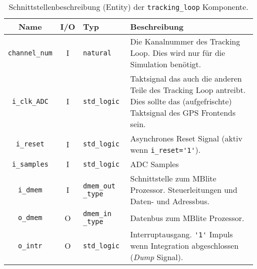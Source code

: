 \begin{table}[htbp]
    \ttabbox
    {
        \caption[Carrier NCO Schnittstelle]{Schnittstellenbeschreibung (Entity) der \lstinline$tracking_loop$ Komponente.}
        \label{Tab_tracking_loop_Entity}
    }
    {
    \begin{tabular}{c c  p{1.5cm} p{6cm}}
        \toprule
        Name                    & I/O	& Typ				& Beschreibung \\
        \midrule
        \lstinline$channel_num$	& I	& \lstinline$natural$		& Die Kanalnummer des Tracking Loop. Dies wird nur für die Simulation benötigt. \\
        \lstinline$i_clk_ADC$	& I	& \lstinline$std_logic$		& Taktsignal das auch die anderen Teile des Tracking Loop antreibt. Dies sollte das (aufgefrischte) Taktsignal des GPS Frontends sein.\\
        \lstinline$i_reset$	& I	& \lstinline$std_logic$		& Asynchrones Reset Signal (aktiv wenn \lstinline$i_reset='1'$). \\
        \lstinline$i_samples$	& I	& \lstinline$std_logic$		& ADC Samples \\
        \lstinline$i_dmem$	& I	& \lstinline$dmem_out _type$	& Schnittstelle zum MBlite Prozessor. Steuerleitungen und Daten- und Adressbus. \\
        \lstinline$o_dmem$	& O	& \lstinline$dmem_in _type$	& Datenbus zum MBlite Prozessor. \\
        \lstinline$o_intr$	& O	& \lstinline$std_logic$		& Interruptausgang. \lstinline$'1'$ Impuls wenn Integration abgeschlossen (\emph{Dump} Signal).\\
        \bottomrule
    \end{tabular}
}
\end{table}

